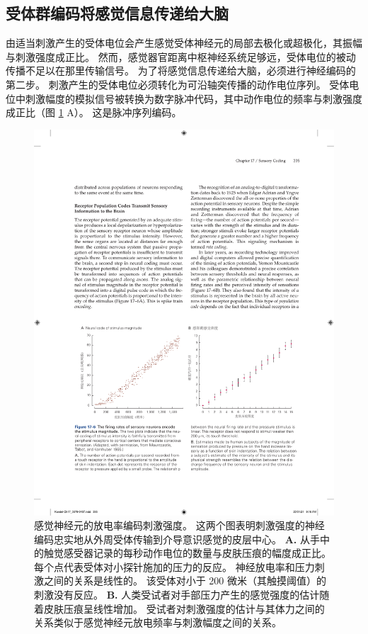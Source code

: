 \subsection{受体群编码将感觉信息传递给大脑}

由适当刺激产生的受体电位会产生感觉受体神经元的局部去极化或超极化，其振幅与刺激强度成正比。 
然而，感觉器官距离中枢神经系统足够远，受体电位的被动传播不足以在那里传输信号。 
为了将感觉信息传递给大脑，必须进行神经编码的第二步。 
刺激产生的受体电位必须转化为可沿轴突传播的动作电位序列。 
受体电位中刺激幅度的模拟信号被转换为数字脉冲代码，其中动作电位的频率与刺激强度成正比（图 \ref{fig:17_6} A）。 
这是脉冲序列编码。

\begin{figure}[htbp]
	\centering
	\includegraphics[width=1.0\linewidth]{chap17/fig_17_6}
	\caption{感觉神经元的放电率编码刺激强度。 
		这两个图表明刺激强度的神经编码忠实地从外周受体传输到介导意识感觉的皮层中心\cite{mountcastle1966neural}。
		\textbf{A.} 从手中的触觉感受器记录的每秒动作电位的数量与皮肤压痕的幅度成正比。 
		每个点代表受体对小探针施加的压力的反应。 
		神经放电率和压力刺激之间的关系是线性的。 
		该受体对小于 200 微米（其触摸阈值）的刺激没有反应。 
		\textbf{B.} 人类受试者对手部压力产生的感觉强度的估计随着皮肤压痕呈线性增加。 
		受试者对刺激强度的估计与其体力之间的关系类似于感觉神经元放电频率与刺激幅度之间的关系。}
	\label{fig:17_6}
\end{figure}



